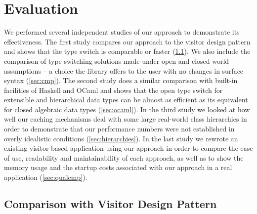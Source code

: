 \section{Evaluation} %
\label{sec:eval}

We performed several independent studies of our approach to demonstrate its 
effectiveness. The first study compares our approach to the visitor design 
pattern and shows that the type switch is comparable or faster 
(\textsection\ref{sec:viscmp}). We also include the comparison of type switching 
solutions made under open and closed world assumptions -- a choice the library 
offers to the user with no changes in surface syntax (\textsection\ref{sec:cmp}).  
The second study does a similar comparison with built-in facilities of Haskell 
and OCaml and shows that the open type switch for extensible and hierarchical 
data types can be almost as efficient as its equivalent for closed algebraic 
data types (\textsection\ref{sec:ocaml}). In the third study we looked at how 
well our caching mechanisms deal with some large real-world class hierarchies in 
order to demonstrate that our performance numbers were not established in overly 
idealistic conditions (\textsection\ref{sec:hierarchies}). In the last study we 
rewrote an existing visitor-based application using our approach in order to 
compare the ease of use, readability and maintainability of each approach, as 
well as to show the memory usage and the startup costs associated with our 
approach in a real application (\textsection\ref{sec:qualcmp}).

\subsection{Comparison with Visitor Design Pattern}
\label{sec:viscmp}


